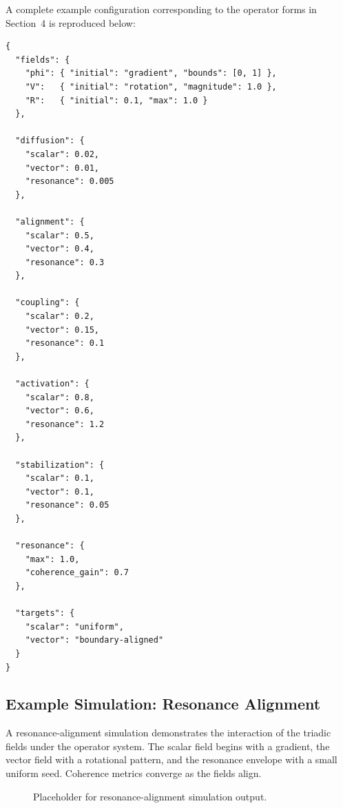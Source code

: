 A complete example configuration corresponding to the operator forms in
Section~4 is reproduced below:

\begin{verbatim}
{
  "fields": {
    "phi": { "initial": "gradient", "bounds": [0, 1] },
    "V":   { "initial": "rotation", "magnitude": 1.0 },
    "R":   { "initial": 0.1, "max": 1.0 }
  },

  "diffusion": {
    "scalar": 0.02,
    "vector": 0.01,
    "resonance": 0.005
  },

  "alignment": {
    "scalar": 0.5,
    "vector": 0.4,
    "resonance": 0.3
  },

  "coupling": {
    "scalar": 0.2,
    "vector": 0.15,
    "resonance": 0.1
  },

  "activation": {
    "scalar": 0.8,
    "vector": 0.6,
    "resonance": 1.2
  },

  "stabilization": {
    "scalar": 0.1,
    "vector": 0.1,
    "resonance": 0.05
  },

  "resonance": {
    "max": 1.0,
    "coherence_gain": 0.7
  },

  "targets": {
    "scalar": "uniform",
    "vector": "boundary-aligned"
  }
}
\end{verbatim}

\subsection{Example Simulation: Resonance Alignment}

A resonance-alignment simulation demonstrates the interaction of the triadic
fields under the operator system. The scalar field begins with a gradient,
the vector field with a rotational pattern, and the resonance envelope with a
small uniform seed. Coherence metrics converge as the fields align.

\begin{figure}[h]
\centering
{}
\caption{Placeholder for resonance-alignment simulation output.}
\label{fig:sim-placeholder}
\end{figure}

